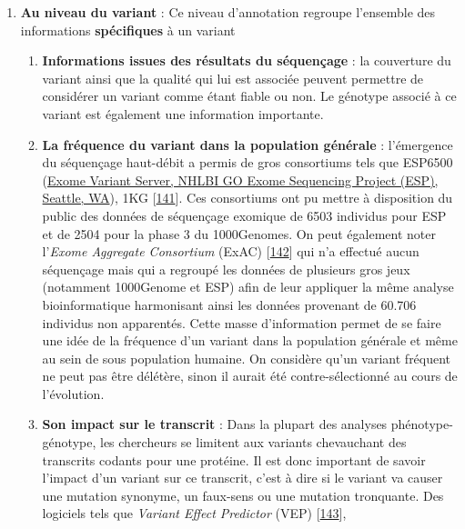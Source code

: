 \documentclass[12pt,twoside]{reedthesis}
\providecommand{\tightlist}{%
  \setlength{\itemsep}{0pt}\setlength{\parskip}{0pt}}
\theoremstyle{definition}
\theoremstyle{definition}
\theoremstyle{remark}
\begin{document}
  \begin{enumerate}
  \def\labelenumi{\arabic{enumi}.}
  \tightlist
  \item
    \textbf{Au niveau du variant} : Ce niveau d'annotation regroupe
    l'ensemble des informations \textbf{spécifiques} à un variant
  
    \begin{enumerate}
    \def\labelenumii{\alph{enumii}.}
    \item
      \textbf{Informations issues des résultats du séquençage} : la
      couverture du variant ainsi que la qualité qui lui est associée
      peuvent permettre de considérer un variant comme étant fiable ou
      non. Le génotype associé à ce variant est également une information
      importante.
    \item
      \textbf{La fréquence du variant dans la population générale} :
      l'émergence du séquençage haut-débit a permis de gros consortiums
      tels que ESP6500 (\href{http://evs.gs.washington.edu/EVS/}{Exome
      Variant Server, NHLBI GO Exome Sequencing Project (ESP), Seattle,
      WA}), 1KG
      {[}\protect\hyperlink{ref-1000GenomesProjectConsortium2015}{141}{]}.
      Ces consortiums ont pu mettre à disposition du public des données de
      séquençage exomique de 6503 individus pour ESP et de 2504 pour la
      phase 3 du 1000Genomes. On peut également noter l'\emph{Exome
      Aggregate Consortium} (ExAC)
      {[}\protect\hyperlink{ref-Lek2016}{142}{]} qui n'a effectué aucun
      séquençage mais qui a regroupé les données de plusieurs gros jeux
      (notamment 1000Genome et ESP) afin de leur appliquer la même analyse
      bioinformatique harmonisant ainsi les données provenant de 60.706
      individus non apparentés. Cette masse d'information permet de se
      faire une idée de la fréquence d'un variant dans la population
      générale et même au sein de sous population humaine. On considère
      qu'un variant fréquent ne peut pas être délétère, sinon il aurait
      été contre-sélectionné au cours de l'évolution.
    \item
      \textbf{Son impact sur le transcrit} : Dans la plupart des analyses
      phénotype-génotype, les chercheurs se limitent aux variants
      chevauchant des transcrits codants pour une protéine. Il est donc
      important de savoir l'impact d'un variant sur ce transcrit, c'est à
      dire si le variant va causer une mutation synonyme, un faux-sens ou
      une mutation tronquante. Des logiciels tels que \emph{Variant Effect
      Predictor} (VEP) {[}\protect\hyperlink{ref-McLaren2016}{143}{]},

\end{enumerate}
\end{enumerate}
\end{document}
